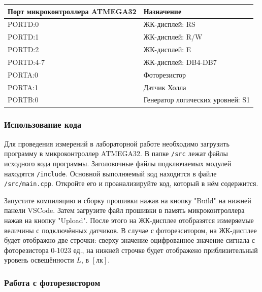 \documentclass[12pt]{article}
\begin{document}
\begin{table}[H]
    \caption{Коммутация модулей}\label{labtable}
    \begin{longtable}[]{@{}l|l@{}}
        \toprule
        Порт микроконтроллера ATMEGA32 & Назначение \\
        \midrule
        \endhead
        PORTD:0 & ЖК-дисплей: RS \\
        PORTD:1 & ЖК-дисплей: R/W \\
        PORTD:2 & ЖК-дисплей: E \\
        PORTD:4-7 & ЖК-дисплей: DB4-DB7 \\
        PORTA:0 & Фоторезистор \\
        PORTA:1 & Датчик Холла \\
        PORTB:0 & Генератор логических уровней: S1 \\
        \bottomrule
    \end{longtable}  
\end{table}

\subsubsection{Использование кода}

Для проведения измерений в лабораторной работе необходимо загрузить программу в микроконтроллер ATMEGA32. В папке \texttt{/src} лежат файлы исходного кода программы. Заголовочные файлы подключаемых модулей находятся \texttt{/include}. Основной выполняемый код находится в файле \texttt{/src/main.cpp}. Откройте его и проанализируйте код, который в нём содержится.

Запустите компиляцию и сборку прошивки нажав на кнопку "Build" на нижней панели VSCode. Затем загрузите файл прошивки в память микроконтроллера нажав на кнопку "Upload". После этого на ЖК-дисплее отобразятся измеряемые величины с подключённых датчиков. В случае с фоторезситором, на ЖК-дисплее будет отображно две строчки: сверху значение оцифрованное значение сигнала с фоторезистора 0-1023 ед., на нижней строчке будет отображено приблизительный уровень освещённости \(L\), в \([\text{лк}]\).

\subsubsection{Работа с фоторезистором}
\end{document}
